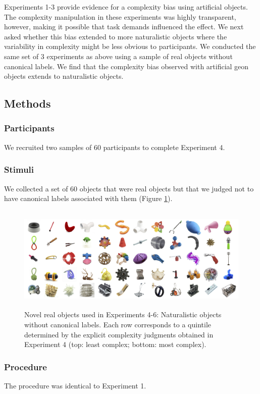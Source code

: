 \documentclass[man]{apa2}
\begin{document}
Experiments 1-3 provide evidence for a complexity bias using artificial objects. The complexity manipulation in these experiments was highly transparent, however, making it possible that task demands influenced the effect. We next asked whether this bias extended to more naturalistic objects where the variability in complexity might be less obvious to participants. We conducted the same set of 3 experiments as above using a sample of real objects without canonical labels. We find that the complexity bias observed with artificial geon objects extends to naturalistic objects.

\subsection{Methods}
\subsubsection{Participants} We recruited two samples of 60 participants to complete Experiment 4.

\subsubsection{Stimuli}
We collected a set of 60 objects that were real objects but that we judged not to have canonical labels associated with them (Figure \ref{fig:realobjs}).

\begin{figure}
 \begin{center}
  \includegraphics[height=2in]{figures/realobjs_stimuli.png}
  \caption{\label{fig:realobjs} Novel real objects used in Experiments 4-6: Naturalistic objects without canonical labels. Each row corresponds to a quintile determined by the explicit complexity judgments obtained in Experiment 4 (top: least complex; bottom: most complex).}
 \end{center}
\end{figure}

\subsubsection{Procedure} The procedure was identical to Experiment 1.
\end{document}
